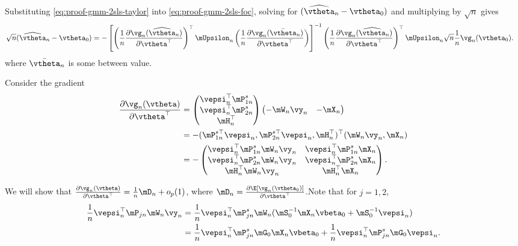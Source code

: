\documentclass[english,12pt]{book}\usepackage[]{graphicx}\usepackage[]{xcolor}
\begin{document}
  
  Substituting \eqref{eq:proof-gmm-2sls-taylor} into \eqref{eq:proof-gmm-2sls-foc}, solving for $(\widehat{\vtheta}_n - \vtheta_0)$ and multiplying by $\sqrt{n}$ gives
  \begin{equation*}
  \begin{aligned}
   \sqrt{n}(\widehat{\vtheta}_n - \vtheta_0) & = -\left[\left(\frac{1}{n}\frac{\partial \vg_n(\widehat{\vtheta}_n)}{\partial \vtheta^\top}\right)^\top\mUpsilon_n\left(\frac{1}{n}\frac{\partial \vg_n(\bar{\vtheta}_n)}{\partial \vtheta^\top}\right)\right]^{-1}\left(\frac{1}{n}\frac{\partial \vg_n(\widehat{\vtheta}_n)}{\partial \vtheta^\top}\right)^\top\mUpsilon_n\sqrt{n}\frac{1}{n}\vg_n(\vtheta_0).
   \end{aligned}
  \end{equation*}
  where $\bar{\vtheta}_n$ is some between value. 
  
  Consider the gradient
  \begin{equation*}
  \begin{aligned}
  \frac{\partial \vg_n(\vtheta)}{\partial \vtheta ^\top} & = 
  \begin{pmatrix}
    \vepsi_n^\top\mP_{1n}^s \\
    \vepsi_n^\top\mP_{2n}^s \\
    \mH_n^\top
    \end{pmatrix}
  \begin{pmatrix}
    -\mW_n\vy_n & -\mX_n
  \end{pmatrix} \\
  & =  - (\mP_{1n}^{s\top} \vepsi_n, \mP_{2n}^{s\top}\vepsi_n, \mH_n^\top)^\top(\mW_n\vy_n, \mX_n) \\
  & = - \begin{pmatrix}
  \vepsi_n^\top\mP_{1n}^s\mW_n\vy_n & \vepsi_n^\top\mP_{1n}^s\mX_n \\
  \vepsi_n^\top\mP_{2n}^s\mW_n\vy_n & \vepsi_n^\top\mP_{2n}^s\mX_n \\
  \mH_n^\top\mW_n\vy_n & \mH_n^\top\mX_n
      \end{pmatrix}.
  \end{aligned}
  \end{equation*}
  
  We will show that $\frac{\partial \vg_n(\vtheta)}{\partial \vtheta ^\top} = \frac{1}{n}\mD_n + o_p(1)$, where $\mD_n = \frac{\partial \E\left[\vg_n(\vtheta_0)\right]}{\partial \vtheta^\top}$.Note that for $j = 1, 2$, 
  \begin{equation*}
  \begin{aligned}
  \frac{1}{n}\vepsi_n^\top \mP_{jn}\mW_n\vy_n  & = \frac{1}{n}\vepsi_n^\top \mP_{jn}^s\mW_n(\mS_0^{-1}\mX_n\vbeta_0 + \mS_0^{-1}\vepsi_n) \\
  & =\frac{1}{n}\vepsi_n^\top \mP_{jn}^s\mG_0\mX_n\vbeta_0 + \frac{1}{n}\vepsi_n^\top\mP_{jn}^s\mG_0\vepsi_n.
  \end{aligned}
  \end{equation*}
  
\end{document}

